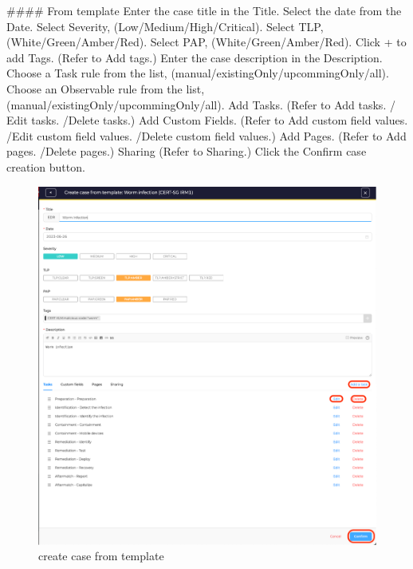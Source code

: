\begin{markdown}
#### From template
Enter the case title in the Title.
Select the date from the Date.
Select Severity, (Low/Medium/High/Critical).
Select TLP, (White/Green/Amber/Red).
Select PAP, (White/Green/Amber/Red).
Click + to add Tags. (Refer to Add tags.)
Enter the case description in the Description.
Choose a Task rule from the list, (manual/existingOnly/upcommingOnly/all).
Choose an Observable rule from the list, (manual/existingOnly/upcommingOnly/all).
Add Tasks. (Refer to Add tasks. / Edit tasks. /Delete tasks.)
Add Custom Fields. (Refer to Add custom field values. /Edit custom field values. /Delete custom field values.)
Add Pages. (Refer to Add pages. /Delete pages.)
Sharing (Refer to Sharing.)
Click the Confirm case creation button.
\end{markdown}

\begin{figure}[H]
    \centering
    \includegraphics[width=\textwidth]{images/docs/analyst/cases/create/create_case_edr_template.png}
    \caption{create case from template}
    \label{fig:modules}
\end{figure}
